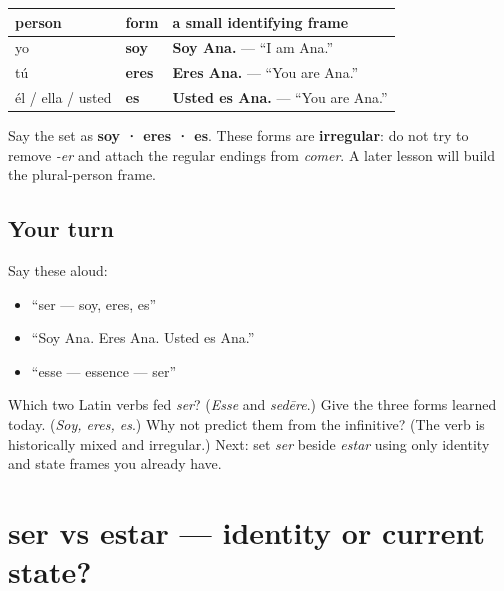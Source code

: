 \begin{grammarlens}[title={Grammar Lens: only three forms today}]
\noindent
\begin{tabularx}{\linewidth}{@{}>{\raggedright\arraybackslash}X>{\raggedright\arraybackslash}X>{\raggedright\arraybackslash}X@{}}
\toprule
\textbf{person} & \textbf{form} & \textbf{a small identifying frame} \\
\midrule
yo & \textbf{soy} & \textbf{Soy Ana.} — “I am Ana.” \\
tú & \textbf{eres} & \textbf{Eres Ana.} — “You are Ana.” \\
él / ella / usted & \textbf{es} & \textbf{Usted es Ana.} — “You are Ana.” \\
\bottomrule
\end{tabularx}

Say the set as \textbf{soy · eres · es}. These forms are \textbf{irregular}: do not try to remove \emph{-er} and attach the regular endings from \emph{comer}. A later lesson will build the plural-person frame.
\end{grammarlens}

\subsection*{Your turn}
Say these aloud:

\begin{itemize}
\raggedright
  \item “ser — soy, eres, es”
  \item “Soy Ana. Eres Ana. Usted es Ana.”
  \item “esse — essence — ser”
\end{itemize}

\begin{tcolorbox}[breakable,colback=teal!4,colframe=teal!35!black,title={Before you move on}]
Which two Latin verbs fed \emph{ser}? (\emph{Esse} and \emph{sedēre}.) Give the three forms learned today. (\emph{Soy, eres, es}.) Why not predict them from the infinitive? (The verb is historically mixed and irregular.) Next: set \emph{ser} beside \emph{estar} using only identity and state frames you already have.
\end{tcolorbox}
\section[ser vs estar]{ser vs estar — identity or current state?}

\label{lesson:ES-C09-ser-vs-estar}



